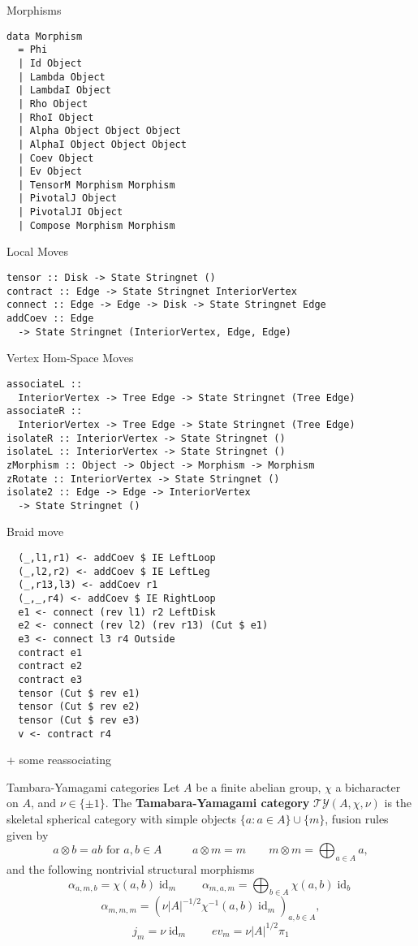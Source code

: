 \documentclass{beamer}
\DeclareMathOperator{\id}{id}
\begin{document}
\begin{frame}[fragile]{Morphisms}
\begin{verbatim}
data Morphism
  = Phi
  | Id Object
  | Lambda Object
  | LambdaI Object
  | Rho Object
  | RhoI Object
  | Alpha Object Object Object
  | AlphaI Object Object Object
  | Coev Object
  | Ev Object
  | TensorM Morphism Morphism
  | PivotalJ Object
  | PivotalJI Object
  | Compose Morphism Morphism
\end{verbatim}
\end{frame}

\begin{frame}[fragile]{Local Moves}
\begin{verbatim}
tensor :: Disk -> State Stringnet ()
contract :: Edge -> State Stringnet InteriorVertex
connect :: Edge -> Edge -> Disk -> State Stringnet Edge
addCoev :: Edge 
  -> State Stringnet (InteriorVertex, Edge, Edge)
\end{verbatim}
\end{frame}

\begin{frame}[fragile]{Vertex Hom-Space Moves}
\begin{verbatim}
associateL ::
  InteriorVertex -> Tree Edge -> State Stringnet (Tree Edge)
associateR ::
  InteriorVertex -> Tree Edge -> State Stringnet (Tree Edge)
isolateR :: InteriorVertex -> State Stringnet ()
isolateL :: InteriorVertex -> State Stringnet ()
zMorphism :: Object -> Object -> Morphism -> Morphism
zRotate :: InteriorVertex -> State Stringnet ()
isolate2 :: Edge -> Edge -> InteriorVertex 
  -> State Stringnet ()
\end{verbatim}
\end{frame}

\begin{frame}[fragile]{Braid move}
\begin{verbatim}
  (_,l1,r1) <- addCoev $ IE LeftLoop
  (_,l2,r2) <- addCoev $ IE LeftLeg
  (_,r13,l3) <- addCoev r1
  (_,_,r4) <- addCoev $ IE RightLoop
  e1 <- connect (rev l1) r2 LeftDisk
  e2 <- connect (rev l2) (rev r13) (Cut $ e1)
  e3 <- connect l3 r4 Outside
  contract e1                   
  contract e2
  contract e3
  tensor (Cut $ rev e1)
  tensor (Cut $ rev e2)
  tensor (Cut $ rev e3)
  v <- contract r4
\end{verbatim}
+ some reassociating 
\end{frame}

\begin{frame}{Tambara-Yamagami categories}
Let $A$ be a finite abelian group, $\chi$ a bicharacter on $A$,
and $\nu \in \{\pm 1\}$. The \textbf{Tamabara-Yamagami category} $\mathcal{TY}(A, \chi, \nu)$ is the skeletal spherical category with
simple objects $\{a : a \in A\} \cup \{m\}$, fusion rules given by
\[ a \otimes b = ab \text{ for $a,b \in A$ } \qquad 
a \otimes m = m \qquad
m \otimes m = \bigoplus_{a \in A} a, 
\]
and the following nontrivial structural morphisms
\[
\alpha_{a,m,b} = \chi(a,b) \id_m \qquad  
\alpha_{m,a,m}  = \bigoplus_{b \in A} \chi(a,b) \id_b 
\]
\[
\alpha_{m,m,m} = (\nu |A|^{-1/2} \chi^{-1}(a,b) \id_m)_{a,b \in A},
\]
\[
j_m = \nu \id_m  \qquad  ev_m = \nu |A|^{1/2} \pi_1
\]
\end{frame}
\end{document}
